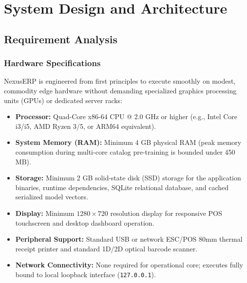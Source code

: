\clearpage
\chapter{System Design and Architecture}
\section{Requirement Analysis}
\subsection{Hardware Specifications}
NexusERP is engineered from first principles to execute smoothly on modest, commodity edge hardware without demanding specialized graphics processing units (GPUs) or dedicated server racks:
\begin{itemize}
    \item \textbf{Processor:} Quad-Core x86-64 CPU @ 2.0 GHz or higher (e.g., Intel Core i3/i5, AMD Ryzen 3/5, or ARM64 equivalent).
    \item \textbf{System Memory (RAM):} Minimum 4 GB physical RAM (peak memory consumption during multi-core catalog pre-training is bounded under 450 MB).
    \item \textbf{Storage:} Minimum 2 GB solid-state disk (SSD) storage for the application binaries, runtime dependencies, SQLite relational database, and cached serialized model vectors.
    \item \textbf{Display:} Minimum $1280 \times 720$ resolution display for responsive POS touchscreen and desktop dashboard operation.
    \item \textbf{Peripheral Support:} Standard USB or network ESC/POS 80mm thermal receipt printer and standard 1D/2D optical barcode scanner.
    \item \textbf{Network Connectivity:} None required for operational core; executes fully bound to local loopback interface (\texttt{127.0.0.1}).
\end{itemize}


